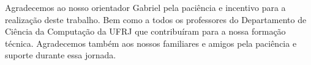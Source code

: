 \begin{agradecimentos}


Agradecemos ao nosso orientador Gabriel pela paciência e incentivo para a realização deste trabalho. Bem como a todos os professores do Departamento de Ciência da Computação da UFRJ que contribuíram para a nossa formação técnica. Agradecemos também aos nossos familiares e amigos pela paciência e suporte durante essa jornada.

\end{agradecimentos}
